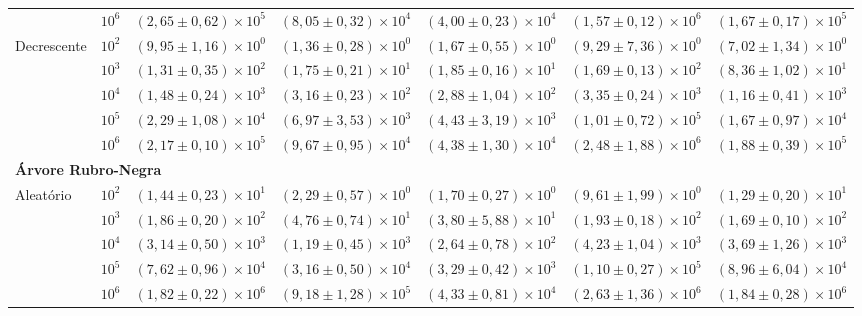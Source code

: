 \documentclass[12pt,a4paper]{report}
\begin{document}
\begin{table}[htbp]
\begin{tabular}{llccccc}
     & $10^{6}$ & $(2,65 \pm 0,62) \times 10^{5}$ & $(8,05 \pm 0,32) \times 10^{4}$ & $(4,00 \pm 0,23) \times 10^{4}$ & $(1,57 \pm 0,12) \times 10^{6}$ & $(1,67 \pm 0,17) \times 10^{5}$ \\
    \cmidrule{2-7}
    \multirow{5}{*}{Decrescente} & $10^{2}$ & $(9,95 \pm 1,16) \times 10^{0}$ & $(1,36 \pm 0,28) \times 10^{0}$ & $(1,67 \pm 0,55) \times 10^{0}$ & $(9,29 \pm 7,36) \times 10^{0}$ & $(7,02 \pm 1,34) \times 10^{0}$ \\
     & $10^{3}$ & $(1,31 \pm 0,35) \times 10^{2}$ & $(1,75 \pm 0,21) \times 10^{1}$ & $(1,85 \pm 0,16) \times 10^{1}$ & $(1,69 \pm 0,13) \times 10^{2}$ & $(8,36 \pm 1,02) \times 10^{1}$ \\
     & $10^{4}$ & $(1,48 \pm 0,24) \times 10^{3}$ & $(3,16 \pm 0,23) \times 10^{2}$ & $(2,88 \pm 1,04) \times 10^{2}$ & $(3,35 \pm 0,24) \times 10^{3}$ & $(1,16 \pm 0,41) \times 10^{3}$ \\
     & $10^{5}$ & $(2,29 \pm 1,08) \times 10^{4}$ & $(6,97 \pm 3,53) \times 10^{3}$ & $(4,43 \pm 3,19) \times 10^{3}$ & $(1,01 \pm 0,72) \times 10^{5}$ & $(1,67 \pm 0,97) \times 10^{4}$ \\
     & $10^{6}$ & $(2,17 \pm 0,10) \times 10^{5}$ & $(9,67 \pm 0,95) \times 10^{4}$ & $(4,38 \pm 1,30) \times 10^{4}$ & $(2,48 \pm 1,88) \times 10^{6}$ & $(1,88 \pm 0,39) \times 10^{5}$ \\
    \midrule
    \multicolumn{7}{l}{\textbf{Árvore Rubro-Negra}} \\
    \midrule
    \multirow{5}{*}{Aleatório} & $10^{2}$ & $(1,44 \pm 0,23) \times 10^{1}$ & $(2,29 \pm 0,57) \times 10^{0}$ & $(1,70 \pm 0,27) \times 10^{0}$ & $(9,61 \pm 1,99) \times 10^{0}$ & $(1,29 \pm 0,20) \times 10^{1}$ \\
     & $10^{3}$ & $(1,86 \pm 0,20) \times 10^{2}$ & $(4,76 \pm 0,74) \times 10^{1}$ & $(3,80 \pm 5,88) \times 10^{1}$ & $(1,93 \pm 0,18) \times 10^{2}$ & $(1,69 \pm 0,10) \times 10^{2}$ \\
     & $10^{4}$ & $(3,14 \pm 0,50) \times 10^{3}$ & $(1,19 \pm 0,45) \times 10^{3}$ & $(2,64 \pm 0,78) \times 10^{2}$ & $(4,23 \pm 1,04) \times 10^{3}$ & $(3,69 \pm 1,26) \times 10^{3}$ \\
     & $10^{5}$ & $(7,62 \pm 0,96) \times 10^{4}$ & $(3,16 \pm 0,50) \times 10^{4}$ & $(3,29 \pm 0,42) \times 10^{3}$ & $(1,10 \pm 0,27) \times 10^{5}$ & $(8,96 \pm 6,04) \times 10^{4}$ \\
     & $10^{6}$ & $(1,82 \pm 0,22) \times 10^{6}$ & $(9,18 \pm 1,28) \times 10^{5}$ & $(4,33 \pm 0,81) \times 10^{4}$ & $(2,63 \pm 1,36) \times 10^{6}$ & $(1,84 \pm 0,28) \times 10^{6}$ \\

\end{tabular}
\end{table}
\end{document}
